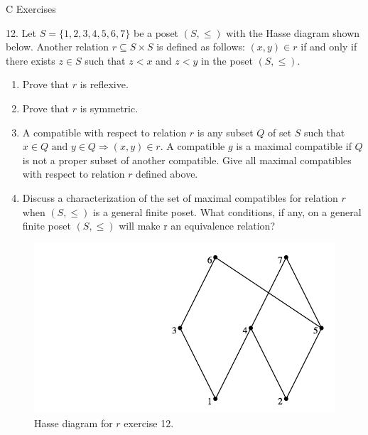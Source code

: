\documentclass[10pt,]{book}
\theoremstyle{plain}
\theoremstyle{definition}
\theoremstyle{definition}
\theoremstyle{definition}
\theoremstyle{definition}
\begin{document}
\par\smallskip\noindent
\hypertarget{exercisegroup-7}{}\typeout{************************************************}
\typeout{************************************************}
C Exercises%
\begin{exercisegroup}
\item[12.]\hypertarget{exercise-6-3-12}{}Let \(S = \{1,2,3,4,5,6,7\}\) be a poset \((S, \leq )\) with the Hasse diagram shown below. Another relation \(r \subseteq  S\times S\) is defined as follows: \((x, y) \in  r\) if and only if there exists \(z \in S\) such that \(z < x\) and \(z < y\) in the poset \((S, \leq )\).%
\par
\leavevmode%
\begin{enumerate}[label=\alph*]
\item\hypertarget{li-85}{} Prove that \(r\) is reflexive.%
\item\hypertarget{li-86}{} Prove that \(r\) is symmetric.%
\item\hypertarget{li-87}{} A compatible with respect to relation \(r\) is any subset \(Q\) of set \(S\) such that \(x \in  Q \textrm{ and } y \in Q \Rightarrow  (x, y) \in r\). A compatible \(g\) is a maximal compatible if \(Q\) is not a proper subset of another compatible. Give all maximal compatibles with respect to relation \(r\) defined above.%
\item\hypertarget{li-88}{} Discuss a characterization of the set of maximal compatibles for relation \(r\) when \((S, \leq )\) is a general finite poset. What conditions, if any, on a general finite poset \((S, \leq )\) will make r an equivalence relation?%
\end{enumerate}
%
\leavevmode%
\begin{figure}
\centering
\includegraphics[width=1\linewidth]{images/exercise-6-12.png}
\caption{Hasse diagram for \(r\) exercise 12.
                \label{fig-exercise-6-12}}
\end{figure}
\par\smallskip
\end{exercisegroup}
\par\smallskip\noindent
\typeout{************************************************}
\typeout{************************************************}
\end{document}
